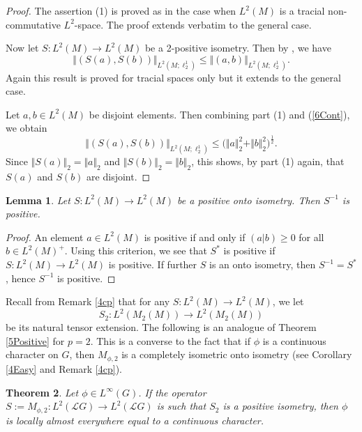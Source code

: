 \documentclass[12pt]{amsart}
\newcommand{\norm}[1]{\Vert#1\Vert}
\newcommand{\bignorm}[1]{\bigl\Vert#1\bigr\Vert}
\newtheorem{theorem}{Theorem}[section]
\newtheorem{lemma}[theorem]{Lemma}
\theoremstyle{remark}
\theoremstyle{definition}
\numberwithin{equation}{section}
\begin{document}
\begin{proof}
The assertion (1) is proved as \cite[Lemma 4.1]{LMZ} in the case when $L^2(M)$ is a tracial 
non-commutative $L^2$-space. The proof extends verbatim to the general case.

Now let $S\colon L^2(M)\to L^2(M)$ be a 2-positive isometry. Then by
\cite[Proposition 5.1]{LMZ}, we have
\begin{equation}\label{6Cont}
\norm{(S(a),S(b))}_{L^2(M; \ell^1_2)}\leq\bignorm{(a,b)}_{L^2(M; \ell^1_2)}.
\end{equation}
Again this result is proved for tracial spaces only but it extends to the general case.

Let $a,b\in L^2(M)$ be disjoint elements. Then combining part (1) and (\ref{6Cont}), we obtain
$$
\norm{(S(a),S(b))}_{L^2(M; \ell^1_2)}\leq\bigl(\norm{a}_2^2 +\norm{b}_2^2\bigr)^\frac12.
$$
Since $\norm{S(a)}_2=\norm{a}_2$ and $\norm{S(b)}_2=\norm{b}_2$, this shows, by part (1) again, that
$S(a)$ and $S(b)$ are disjoint.
\end{proof}


\begin{lemma}\label{6Pos}
Let $S\colon L^2(M)\to L^2(M)$ be a positive onto isometry. Then 
$S^{-1}$ is positive.
\end{lemma}

\begin{proof}
An element $a\in L^2(M)$ is positive if and only if 
$(a\vert b)\geq 0$ for all $b\in L^2(M)^+$. Using this criterion,
we see that $S^*$ is positive if $S\colon L^2(M)\to L^2(M)$ is positive.
If further $S$ is an onto isometry, then 
$S^{-1}=S^*$, hence $S^{-1}$ is positive.
\end{proof}



Recall from Remark \ref{4cp} that for any
$S\colon L^2(M)\to L^2(M)$, we let 
$$
S_2 \colon L^2(M_2(M))\longrightarrow
L^2(M_2(M))
$$
be its natural tensor extension.
The following is an analogue of Theorem \ref{5Positive} for $p=2$. 
This is a converse to the fact that if $\phi$ is a continuous 
character on $G$, then $M_{\phi,2}$ is a completely isometric onto isometry
(see Corollary \ref{4Easy} and Remark \ref{4cp}).







\begin{theorem}\label{6p=2}
Let $\phi\in L^\infty(G)$. If the operator 
$S:=M_{\phi,2}\colon L^2({\mathcal L}G)\to L^2({\mathcal L}G)$
is such that  $S_2$ is a positive isometry, then $\phi$ is locally 
almost everywhere equal to a continuous character.
\end{theorem}
\end{document}
